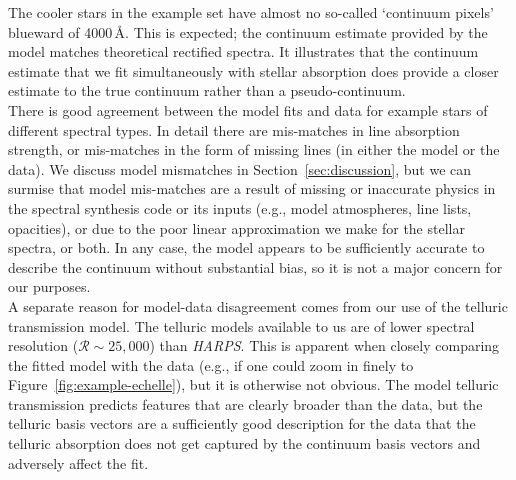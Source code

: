 \documentclass[modern]{aastex631}
\newcommand{\project}[1]{\textit{#1}}
\newcommand{\harps}{\project{HARPS}}
\begin{document}
The cooler stars in the example set have almost no so-called `continuum pixels' blueward of 4000\,\AA. This is expected; the continuum estimate provided by the model matches theoretical rectified spectra. It illustrates that the continuum estimate that we fit simultaneously with stellar absorption does provide a closer estimate to the true continuum rather than a pseudo-continuum.\\

There is good agreement between the model fits and data for example stars of different spectral types. In detail there are mis-matches in line absorption strength, or mis-matches in the form of missing lines (in either the model or the data). We discuss model mismatches in Section~\ref{sec:discussion}, but we can surmise that model mis-matches are a result of missing or inaccurate physics in the spectral synthesis code or its inputs (e.g., model atmospheres, line lists, opacities), or due to the poor linear approximation we make for the stellar spectra, or both. In any case, the model appears to be sufficiently accurate to describe the continuum without substantial bias, so it is not a major concern for our purposes. \\

A separate reason for model-data disagreement comes from our use of the telluric transmission model. The telluric models available to us are of lower spectral resolution ($\mathcal{R} \sim 25{,}000$) than \harps. This is apparent when closely comparing the fitted model with the data (e.g., if one could zoom in finely to Figure~\ref{fig:example-echelle}), but it is otherwise not obvious. The model telluric transmission predicts features that are clearly broader than the data, but the telluric basis vectors are a sufficiently good description for the data that the telluric absorption does not get captured by the continuum basis vectors and adversely affect the fit.\\
\end{document}
